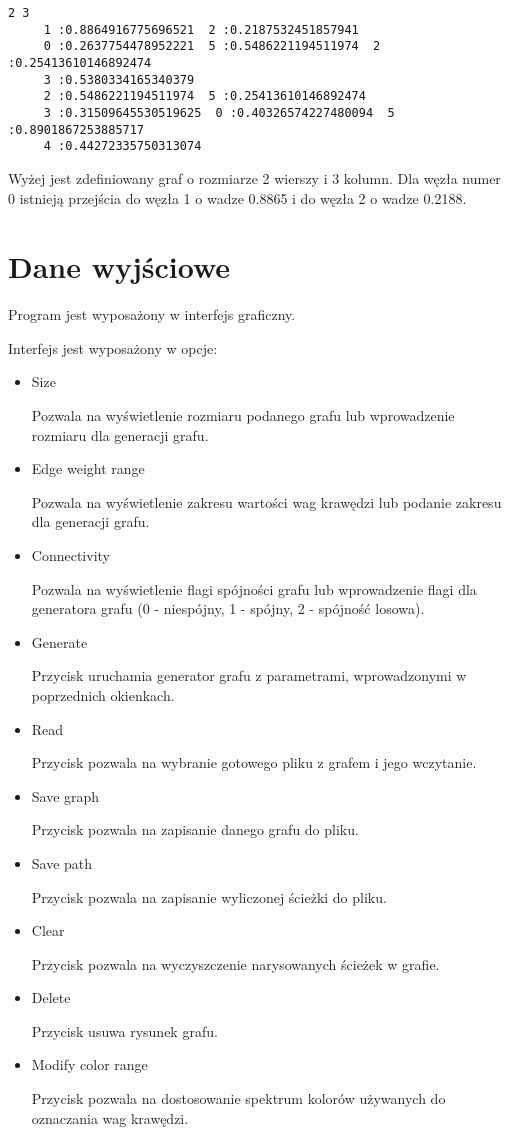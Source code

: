 \documentclass[]{article}
\begin{document}
\begin{verbatim}
2 3
	 1 :0.8864916775696521  2 :0.2187532451857941 
	 0 :0.2637754478952221  5 :0.5486221194511974  2 :0.25413610146892474
	 3 :0.5380334165340379
	 2 :0.5486221194511974  5 :0.25413610146892474
	 3 :0.31509645530519625  0 :0.40326574227480094  5 :0.8901867253885717
	 4 :0.44272335750313074
\end{verbatim}
Wyżej jest zdefiniowany graf o rozmiarze 2 wierszy i 3 kolumn. Dla węzła numer 0 istnieją przejścia do węzła 1 o wadze 0.8865 i do węzła 2 o wadze 0.2188.

\section{Dane wyjściowe}\label{header-n279}
Program jest wyposażony w interfejs graficzny.

Interfejs jest wyposażony w opcje:
\begin{itemize}
    \item Size
    
    Pozwala na wyświetlenie rozmiaru podanego grafu lub wprowadzenie rozmiaru dla generacji grafu.
    \item Edge weight range
    
    Pozwala na wyświetlenie zakresu wartości wag krawędzi lub podanie zakresu dla generacji grafu.
    
    \item Connectivity
    
    Pozwala na wyświetlenie flagi spójności grafu lub wprowadzenie flagi dla generatora grafu (0 - niespójny, 1 - spójny, 2 - spójność losowa).
    \item Generate
    
    Przycisk uruchamia generator grafu z parametrami, wprowadzonymi w poprzednich okienkach.
    \item Read
    
    Przycisk pozwala na wybranie gotowego pliku z grafem i jego wczytanie.
    \item Save graph
    
    Przycisk pozwala na zapisanie danego grafu do pliku.
    \item Save path
    
    Przycisk pozwala na zapisanie wyliczonej ścieżki do pliku.
    \item Clear
    
    
    Przycisk pozwala na wyczyszczenie narysowanych ścieżek w grafie.
    \item Delete
    
    Przycisk usuwa rysunek grafu.
    \item Modify color range
    
    
    Przycisk pozwala na dostosowanie spektrum kolorów używanych do oznaczania wag krawędzi.
\end{itemize}
\end{document}
